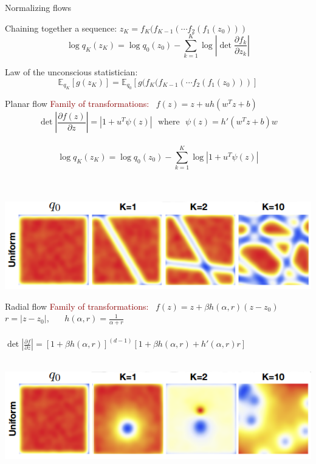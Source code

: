 \documentclass[unicode,11pt]{beamer}
\begin{document}
\begin{frame}[fragile]{Normalizing flows}
  
  Chaining together a sequence: $z_K = f_K ( f_{K−1} ( \cdots f_2 ( f_1(z_0)))$\\
  $$\log q_K(z_K) = \log q_0(z_0) − \sum_{k=1}^K \log \left\vert \det \frac{\partial f_k}{\partial z_k} \right\vert $$

  Law of the unconscious statistician:\\
  $$\mathbb{E}_{q_K} \left[g(z_K)\right] = \mathbb{E}_{q_0} \left[ g(f_K ( f_{K−1} ( \cdots f_2 ( f_1(z_0))) \right] $$
\end{frame}


\begin{frame}[fragile]{Planar flow}
  \textcolor{darkred}{Family of transformations:} ~$f(z) = z + uh\left( w^T z + b \right)$\\ 
  $$ \det \left\vert \frac{\partial f(z)}{\partial z} \right\vert = \left\vert 1 + u^T \psi(z)
  \right\vert ~~~\text{where}~~~ \psi(z) = h'(w^Tz + b)w$$ \\
  $$\log q_K(z_K) = \log q_0(z_0) − \sum_{k=1}^K \log \left\vert 1 + u^T \psi(z) \right\vert $$\\
  ~\\

  \begin{center}
    \includegraphics[width=.8\textwidth]{images/planar_flow}
  \end{center}
\end{frame}


\begin{frame}[fragile]{Radial flow}
  \textcolor{darkred}{Family of transformations:} ~$f(z) = z + \beta h(\alpha, r)(z-z_0)$\\
  \hspace{12em}$r = \vert z-z_0 \vert$,~~~ $h(\alpha, r) = \frac{1}{\alpha + r}$\\
  ~\\
  $\det \left\vert \frac{\partial f}{\partial z} \right\vert = [1 + \beta h(\alpha, r)]^{(d-1)}
  [1 + \beta h(\alpha, r) + h'(\alpha, r) r]$\\
  ~\\

  \begin{center}
    \includegraphics[width=.8\textwidth]{images/radial_flow}
  \end{center}
\end{frame}
\end{document}
